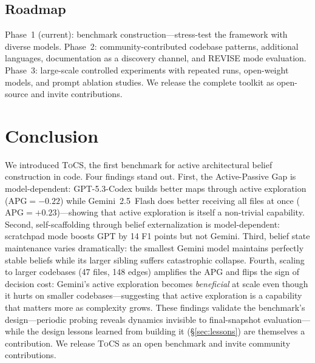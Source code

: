 \documentclass{article}
\newcommand{\tocs}{\textsc{ToCS}}
\begin{document}
\subsection{Roadmap}
\label{sec:roadmap}

Phase~1 (current): benchmark construction---stress-test the framework with diverse models. Phase~2: community-contributed codebase patterns, additional languages, documentation as a discovery channel, and REVISE mode evaluation. Phase~3: large-scale controlled experiments with repeated runs, open-weight models, and prompt ablation studies. We release the complete toolkit as open-source and invite contributions.

\section{Conclusion}
\label{sec:conclusion}

We introduced \tocs{}, the first benchmark for active architectural belief construction in code. Four findings stand out. First, the Active-Passive Gap is model-dependent: GPT-5.3-Codex builds better maps through active exploration ($\text{APG} = -0.22$) while Gemini~2.5~Flash does better receiving all files at once ($\text{APG} = +0.23$)---showing that active exploration is itself a non-trivial capability. Second, self-scaffolding through belief externalization is model-dependent: scratchpad mode boosts GPT by 14 F1 points but not Gemini. Third, belief state maintenance varies dramatically: the smallest Gemini model maintains perfectly stable beliefs while its larger sibling suffers catastrophic collapse. Fourth, scaling to larger codebases (47 files, 148 edges) amplifies the APG and flips the sign of decision cost: Gemini's active exploration becomes \emph{beneficial} at scale even though it hurts on smaller codebases---suggesting that active exploration is a capability that matters more as complexity grows. These findings validate the benchmark's design---periodic probing reveals dynamics invisible to final-snapshot evaluation---while the design lessons learned from building it (\S\ref{sec:lessons}) are themselves a contribution. We release \tocs{} as an open benchmark and invite community contributions.




\appendix
\end{document}
